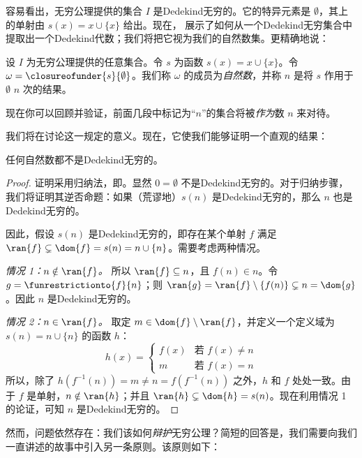 \documentclass[../../../include/open-logic-section]{subfiles}
\begin{document}
容易看出，无穷公理提供的集合 $I$ 是Dedekind无穷的。它的特异元素是 $\emptyset$，其上的单射由 $s(x) = x\cup
\{x\}$ 给出。现在， 展示了如何从一个Dedekind无穷集合中提取出一个Dedekind代数；我们将把它视为我们的自然数集。更精确地说：

\begin{defn}
设 $I$ 为无穷公理提供的任意集合。令 $s$ 为函数 $s(x) = x \cup \{x\}$。令 $\omega = \closureofunder{s}{\emptyset}$。我们称 $\omega$ 的成员为\emph{自然数}，并称 $n$ 是将 $s$ 作用于 $\emptyset$ $n$ 次的结果。
\end{defn}

现在你可以回顾并验证，前面几段中标记为“$n$”的集合将被\emph{作为}数 $n$ 来对待。

我们将在讨论这一规定的意义。现在，它使我们能够证明一个直观的结果：

\begin{prop}
任何自然数都不是Dedekind无穷的。
\end{prop}

\begin{proof}
证明采用归纳法，即。显然 $0=\emptyset$ 不是Dedekind无穷的。对于归纳步骤，我们将证明其逆否命题：如果（荒谬地）$s(n)$ 是Dedekind无穷的，那么 $n$ 也是Dedekind无穷的。

因此，假设 $s(n)$ 是Dedekind无穷的，即存在某个单射 $f$ 满足 $\ran{f}\subsetneq \dom{f} = s(n) = n \cup
\{n\}$。需要考虑两种情况。

\emph{情况 1：$n \notin \ran{f}$。} 所以 $\ran{f} \subseteq n$，且 $f(n) \in n$。令 $g = \funrestrictionto{f}{n}$；则 $\ran{g} =
\ran{f} \setminus \{f(n)\} \subsetneq n = \dom{g}$。因此 $n$ 是Dedekind无穷的。

\emph{情况 2：$n \in \ran{f}$。} 取定 $m \in \dom{f} \setminus \ran{f}$，并定义一个定义域为 $s(n) = n \cup \{n\}$ 的函数 $h$：
\[
h(x) =
	\begin{cases}
		f(x) & \text{若 }f(x) \neq n\\
		m & \text{若 }f(x)=n
	\end{cases}
\]
所以，除了 $h(f^{-1}(n)) = m
\neq n = f(f^{-1}(n))$ 之外，$h$ 和 $f$ 处处一致。由于 $f$ 是单射，$n \notin \ran{h}$；并且 $\ran{h} \subsetneq \dom{h} = s(n)$。现在利用情况 1 的论证，可知 $n$ 是Dedekind无穷的。
\end{proof}

然而，问题依然存在：我们该如何\emph{辩护}无穷公理？简短的回答是，我们需要向我们一直讲述的故事中引入另一条原则。该原则如下：
\end{document}
